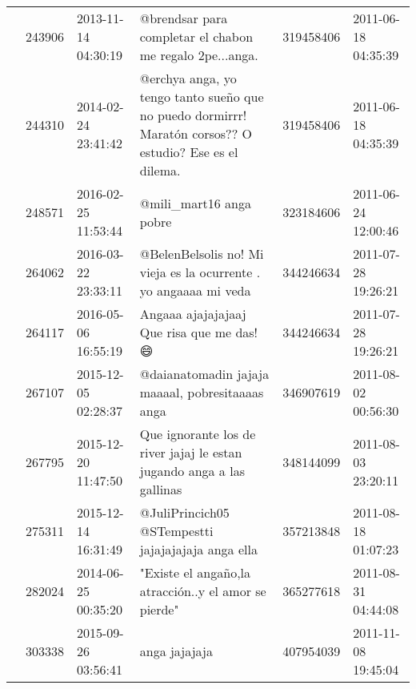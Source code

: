 \begin{tabular}{llllrl}
           & 243906  & 2013-11-14 04:30:19 &                                                                                     @brendsar para completar el chabon me regalo 2pe...anga. &   319458406 & 2011-06-18 04:35:39 \\
           & 244310  & 2014-02-24 23:41:42 &                                      @erchya anga, yo tengo tanto sueño que no puedo dormirrr! Maratón corsos?? O estudio? Ese es el dilema. &   319458406 & 2011-06-18 04:35:39 \\
           & 248571  & 2016-02-25 11:53:44 &                                                                                                                      @mili\_mart16 anga pobre &   323184606 & 2011-06-24 12:00:46 \\
           & 264062  & 2016-03-22 23:33:11 &                                                                             @BelenBelsolis no! Mi vieja es la ocurrente . yo angaaaa mi veda &   344246634 & 2011-07-28 19:26:21 \\
           & 264117  & 2016-05-06 16:55:19 &                                                                                                     Angaaa ajajajajaaj Que risa que me das!😄 &   344246634 & 2011-07-28 19:26:21 \\
           & 267107  & 2015-12-05 02:28:37 &                                                                                             @daianatomadin jajaja maaaal, pobresitaaaas anga &   346907619 & 2011-08-02 00:56:30 \\
           & 267795  & 2015-12-20 11:47:50 &                                                                        Que ignorante los de river jajaj le estan jugando anga a las gallinas &   348144099 & 2011-08-03 23:20:11 \\
           & 275311  & 2015-12-14 16:31:49 &                                                                                           @JuliPrincich05 @STempestti jajajajajaja anga ella &   357213848 & 2011-08-18 01:07:23 \\
           & 282024  & 2014-06-25 00:35:20 &                                                                                         "Existe el angaño,la atracción..y el amor se pierde" &   365277618 & 2011-08-31 04:44:08 \\
           & 303338  & 2015-09-26 03:56:41 &                                                                                                                                anga jajajaja &   407954039 & 2011-11-08 19:45:04 \\

\end{tabular}
